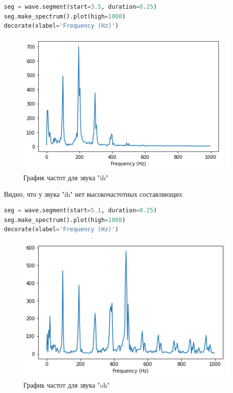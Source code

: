 \begin{lstlisting}[language=Python]
seg = wave.segment(start=3.5, duration=0.25)
seg.make_spectrum().plot(high=1000)
decorate(xlabel='Frequency (Hz)')
\end{lstlisting}

\begin{figure}[H]
	\begin{center}
		\includegraphics[scale=1]{fig/lab03/lab03_17.png}
		\caption{График частот для звука "ih"}
	\end{center}
\end{figure}

Видно, что у звука "ih" нет высокочастотных составляющих

\begin{lstlisting}[language=Python]
seg = wave.segment(start=5.1, duration=0.25)
seg.make_spectrum().plot(high=1000)
decorate(xlabel='Frequency (Hz)')
\end{lstlisting}

\begin{figure}[H]
	\begin{center}
		\includegraphics[scale=1]{fig/lab03/lab03_18.png}
		\caption{График частот для звука "oh"}
	\end{center}
\end{figure}

